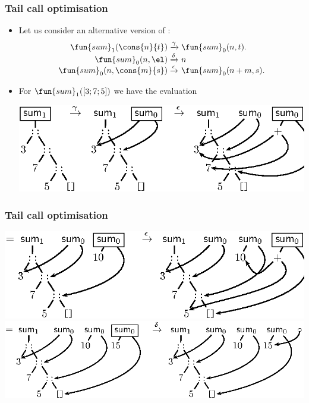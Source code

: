 \documentclass[compress,dvips,xcolor={dvipsnames},t]{beamer}
\begin{document}
\begin{frame}
  \frametitle{Tail call optimisation}

  \begin{itemize}

    \item Let us consider an alternative version of :
      \begin{equation*}
        \begin{array}{@{}r@{\;}l@{\;}l@{}}
          \fun{sum}_1(\cons{n}{t}) & \xrightarrow{\gamma}
          & \fun{sum}_0(n,t).\\
          \fun{sum}_0(n,\el) & \xrightarrow{\delta} & n\\
          \fun{sum}_0(n,\cons{m}{s}) & \xrightarrow{\epsilon}
          & \fun{sum}_0(n+m,s).
        \end{array}
      \end{equation*}

    \item For \(\fun{sum}_1([3;7;5])\) we have the evaluation
      \begin{center}
        \includegraphics[bb=148 584 418 664]{sum0_375_0}
      \end{center}

  \end{itemize}

\end{frame}

\begin{frame}
  \frametitle{Tail call optimisation}

  \begin{center}
    \hspace*{-15mm}
    \includegraphics[bb=148 584 423 664]{sum0_375_1}
    \hspace*{-15mm}
    \includegraphics[bb=148 584 423 664]{sum0_375_2}
  \end{center}

\end{frame}
\end{document}
